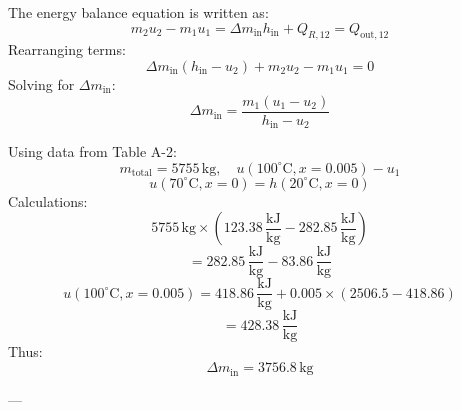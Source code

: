 The energy balance equation is written as:  
\[
m_2 u_2 - m_1 u_1 = \Delta m_{\text{in}} h_{\text{in}} + Q_{R,12} = Q_{\text{out},12}
\]  
Rearranging terms:  
\[
\Delta m_{\text{in}} (h_{\text{in}} - u_2) + m_2 u_2 - m_1 u_1 = 0
\]  
Solving for \( \Delta m_{\text{in}} \):  
\[
\Delta m_{\text{in}} = \frac{m_1 (u_1 - u_2)}{h_{\text{in}} - u_2}
\]  

Using data from Table A-2:  
\[
m_{\text{total}} = 5755 \, \text{kg}, \quad u(100^\circ\text{C}, x=0.005) - u_1
\]  
\[
u(70^\circ\text{C}, x=0) = h(20^\circ\text{C}, x=0)
\]  
Calculations:  
\[
5755 \, \text{kg} \times (123.38 \, \frac{\text{kJ}}{\text{kg}} - 282.85 \, \frac{\text{kJ}}{\text{kg}})
\]  
\[
= 282.85 \, \frac{\text{kJ}}{\text{kg}} - 83.86 \, \frac{\text{kJ}}{\text{kg}}
\]  
\[
u(100^\circ\text{C}, x=0.005) = 418.86 \, \frac{\text{kJ}}{\text{kg}} + 0.005 \times (2506.5 - 418.86)
\]  
\[
= 428.38 \, \frac{\text{kJ}}{\text{kg}}
\]  
Thus:  
\[
\Delta m_{\text{in}} = 3756.8 \, \text{kg}
\]  

---